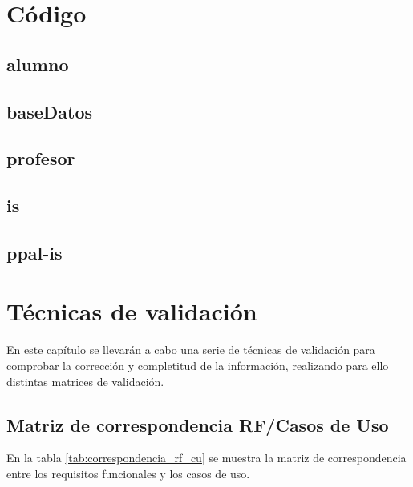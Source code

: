 \newpage
\section{Código}
\subsection{alumno} \label{alumno}



\newpage
\subsection{baseDatos} \label{baseDatos}



\newpage
\subsection{profesor} \label{profesor}



\newpage
\subsection{is} \label{is}


\newpage
\subsection{ppal-is} \label{ppal-is}


\newpage
\section{Técnicas de validación}
En este capítulo se llevarán a cabo una serie de técnicas de validación para comprobar la corrección y completitud de la información, realizando para ello distintas matrices de validación.

\subsection{Matriz de correspondencia RF/Casos de Uso}
En la tabla \ref{tab:correspondencia_rf_cu} se muestra la matriz de correspondencia entre los requisitos funcionales y los casos de uso.

